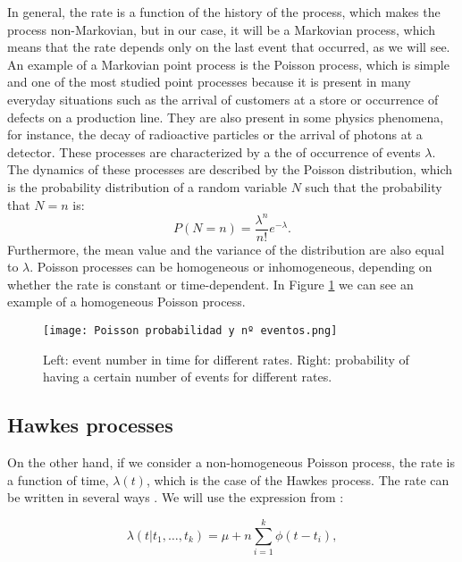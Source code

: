 In general, the rate is a function of the history of the process, which makes the process non-Markovian, but in our case, it will be a Markovian process, which means that the rate depends 
only on the last event that occurred, as we will see. An example of a Markovian point process is the Poisson process, which is simple and one of the most studied point processes because 
it is present in many everyday situations such as the arrival of customers at a store or occurrence of defects on a production line. They are also present in some physics phenomena,
for instance, the decay of radioactive particles or the arrival of photons at a detector. These processes are characterized by a the of occurrence of events $\lambda$.
The dynamics of these processes are described by the Poisson distribution, which is the probability distribution of a random variable $N$ such that the probability that $N= n$ is:
\begin{equation}
    P(N=n) = \dfrac{\lambda^n}{n!}e^{-\lambda}.
    \label{eq: Probabilidad proceso de Poisson homogéneo}
\end{equation}
Furthermore, the mean value and the variance of the distribution are also equal to $\lambda$. Poisson processes can be homogeneous or inhomogeneous, depending on whether the rate is constant
or time-dependent. In Figure \ref{f:poisson} we can see an example of a homogeneous Poisson process.

\begin{figure}[H]
    \centering
    \texttt{[image: Poisson probabilidad y nº eventos.png]}
    \caption{Left: event number in time for different rates. Right: probability of having a certain number of events for different rates.}
    \label{f:poisson}
\end{figure}

\subsection{Hawkes processes} \label{subsec:Hawkes_processes}

On the other hand, if we consider a non-homogeneous Poisson process, the rate is a function of time, $\lambda(t)$, which is the case of the Hawkes process. The rate can be written in several 
ways \cite{notarmuzi2021percolation,kanazawa2021ubiquitous,dassios2013exact,laub2021elements}. We will use the expression from \cite{notarmuzi2021percolation}:

\begin{equation}
    \lambda(t|t_1, \ldots, t_k) = \mu + n\sum_{i=1}^k \phi (t-t_i),
    \label{eq: Hawkes rate}
\end{equation}

